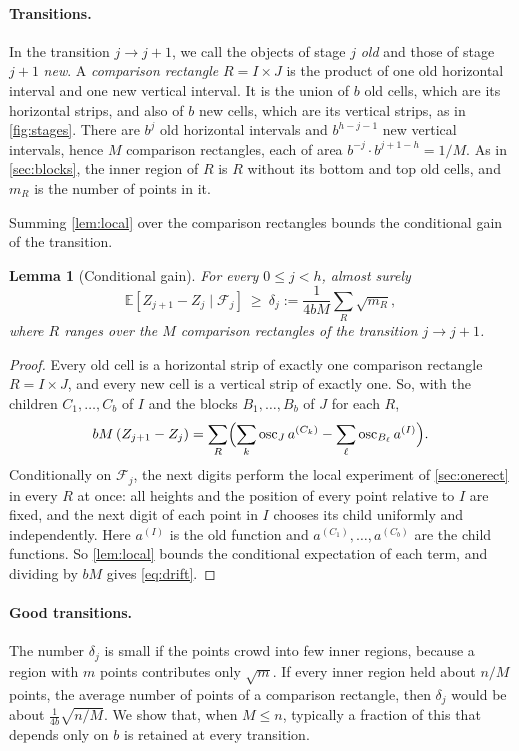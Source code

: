 \documentclass[11pt,letterpaper]{article}
\newtheorem{lemma}[theorem]{Lemma}
\newcommand{\E}{\mathbb{E}}
\newcommand{\F}{\mathcal{F}}
\newcommand{\1}{\mathbf{1}}
\newcommand{\osc}{\operatorname{osc}}
\begin{document}
\paragraph{Transitions.}
In the transition $j\to j+1$, we call the objects of stage $j$ \emph{old} and those of stage $j+1$ \emph{new}. A \emph{comparison rectangle} $R=I\times J$ is the product of one old horizontal interval and one new vertical interval. It is the union of $b$ old cells, which are its horizontal strips, and also of $b$ new cells, which are its vertical strips, as in \cref{fig:stages}. There are $b^j$ old horizontal intervals and $b^{h-j-1}$ new vertical intervals, hence $M$ comparison rectangles, each of area $b^{-j}\cdot b^{j+1-h}=1/M$. As in \cref{sec:blocks}, the inner region of $R$ is $R$ without its bottom and top old cells, and $m_R$ is the number of points in it.

Summing \cref{lem:local} over the comparison rectangles bounds the conditional gain of the transition.

\begin{lemma}[Conditional gain]\label{lem:drift}
For every $0\le j<h$, almost surely
\begin{equation}\label{eq:drift}
\E[Z_{j+1}-Z_j\mid\F_j]\ \ge\ \delta_j:=\frac1{4bM}\sum_R\sqrt{m_R},
\end{equation}
where $R$ ranges over the $M$ comparison rectangles of the transition $j\to j+1$.
\end{lemma}

\begin{proof}
Every old cell is a horizontal strip of exactly one comparison rectangle $R=I\times J$, and every new cell is a vertical strip of exactly one. So, with the children $C_1,\dots,C_b$ of $I$ and the blocks $B_1,\dots,B_b$ of $J$ for each $R$,
\[
bM\,(Z_{j+1}-Z_j)=\sum_R\Bigl(\sum_k\osc_Ja^{(C_k)}-\sum_\ell\osc_{B_\ell}a^{(I)}\Bigr).
\]
Conditionally on $\F_j$, the next digits perform the local experiment of \cref{sec:onerect} in every $R$ at once: all heights and the position of every point relative to $I$ are fixed, and the next digit of each point in $I$ chooses its child uniformly and independently. Here $a^{(I)}$ is the old function and $a^{(C_1)},\dots,a^{(C_b)}$ are the child functions. So \cref{lem:local} bounds the conditional expectation of each term, and dividing by $bM$ gives \eqref{eq:drift}.
\end{proof}

\paragraph{Good transitions.}
The number $\delta_j$ is small if the points crowd into few inner regions, because a region with $m$ points contributes only $\sqrt m$. If every inner region held about $n/M$ points, the average number of points of a comparison rectangle, then $\delta_j$ would be about $\frac1{4b}\sqrt{n/M}$. We show that, when $M\le n$, typically a fraction of this that depends only on $b$ is retained at every transition.
\end{document}

